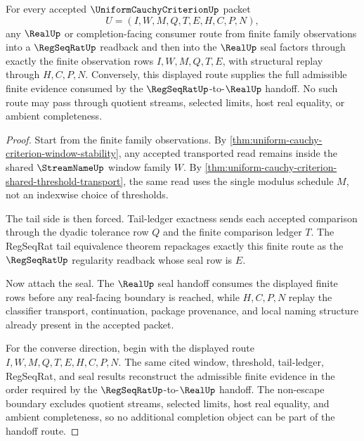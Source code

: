 \begin{theorem}
\label{thm:uniform-cauchy-criterion-real-completion-window-exhaustion}
For every accepted $\UniformCauchyCriterionUp$ packet
$$
U=(I,W,M,Q,T,E,H,C,P,N),
$$
any $\RealUp$ or completion-facing consumer route from finite family
observations into a $\RegSeqRatUp$ readback and then into the $\RealUp$ seal
factors through exactly the finite observation rows $I,W,M,Q,T,E$, with
structural replay through $H,C,P,N$. Conversely, this displayed route supplies
the full admissible finite evidence consumed by the
$\RegSeqRatUp$-to-$\RealUp$ handoff. No such route may pass through quotient
streams, selected limits, host real equality, or ambient completeness.
\end{theorem}
\begin{proof}
Start from the finite family observations. By
\autoref{thm:uniform-cauchy-criterion-window-stability}, any accepted
transported read remains inside the shared $\StreamNameUp$ window family $W$.
By \autoref{thm:uniform-cauchy-criterion-shared-threshold-transport}, the
same read uses the single modulus schedule $M$, not an indexwise choice of
thresholds.

The tail side is then forced. Tail-ledger exactness sends each accepted
comparison through the dyadic tolerance row $Q$ and the finite comparison
ledger $T$. The RegSeqRat tail equivalence theorem repackages exactly this
finite route as the $\RegSeqRatUp$ regularity readback whose seal row is $E$.

Now attach the seal. The $\RealUp$ seal handoff consumes the displayed finite
rows before any real-facing boundary is reached, while $H,C,P,N$ replay the
classifier transport, continuation, package provenance, and local naming
structure already present in the accepted packet.

For the converse direction, begin with the displayed route
$I,W,M,Q,T,E,H,C,P,N$. The same cited window, threshold, tail-ledger,
RegSeqRat, and seal results reconstruct the admissible finite evidence in the
order required by the $\RegSeqRatUp$-to-$\RealUp$ handoff. The non-escape
boundary excludes quotient streams, selected limits, host real equality, and
ambient completeness, so no additional completion object can be part of the
handoff route.
\end{proof}

